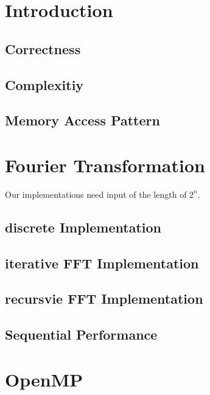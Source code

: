 \documentclass[12pt,a4paper,titlepage,oneside]{scrartcl}
\begin{document}
\maketitle
\setcounter{section}{0}
\setcounter{tocdepth}{2}
\tableofcontents
\pagebreak
%
%
\section{Introduction}
	\subsection{Correctness}
	
	\subsection{Complexitiy}
	
	\pagebreak
	\subsection{Memory Access Pattern}
	
\section{Fourier Transformation}
	Our implementations need input of the length of \(2^{n}\).
	\subsection{discrete Implementation}
	
	\subsection{iterative FFT Implementation}
	
	\subsection{recursvie FFT Implementation}
	
	\subsection{Sequential Performance}	
	
\section{OpenMP}
\end{document}
